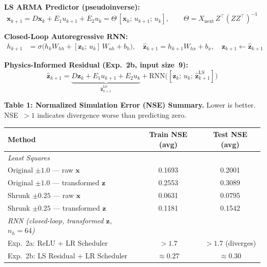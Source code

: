 \documentclass[12pt]{article}
\begin{document}
\noindent\textbf{LS ARMA Predictor (pseudoinverse):}
\begin{equation}
  \mathbf{x}_{k+1} = D\mathbf{x}_k + E_1 u_{k+1} + E_2 u_k = \Theta\,[\mathbf{x}_k;\,u_{k+1};\,u_k], \qquad
  \Theta = X_{\text{next}}\,Z^\top(ZZ^\top)^{-1}
\end{equation}

\noindent\textbf{Closed-Loop Autoregressive RNN:}
\begin{align}
  h_{k+1} &= \sigma\bigl(h_k W_{hh} + [\mathbf{z}_k;\,u_k]\,W_{uh} + b_h\bigr), \quad
  \hat{\mathbf{z}}_{k+1} = h_{k+1}W_{hx} + b_x, \quad \mathbf{z}_{k+1}\leftarrow\hat{\mathbf{z}}_{k+1}
\end{align}

\noindent\textbf{Physics-Informed Residual (Exp.~2b, input size~9):}
\begin{equation}
  \hat{\mathbf{z}}_{k+1} =
    \underbrace{D\mathbf{z}_k+E_1 u_{k+1}+E_2 u_k}_{\hat{\mathbf{z}}_{k+1}^{\text{LS}}}
    + \text{RNN}\bigl([\mathbf{z}_k;\,u_k;\,\hat{\mathbf{z}}_{k+1}^{\text{LS}}]\bigr)
\end{equation}

\vspace{8pt}
\noindent\textbf{Table 1: Normalized Simulation Error (NSE) Summary.}
Lower is better. NSE~$>1$ indicates divergence worse than predicting zero.

\vspace{4pt}
\begin{center}
\small
\begin{tabular}{lcc}
\toprule
\textbf{Method} & \textbf{Train NSE (avg)} & \textbf{Test NSE (avg)}  \\
\midrule
\textit{Least Squares} & & \\
\quad Original $\pm1.0$ --- raw $\mathbf{x}$       & 0.1693 & 0.2001 \\
\quad Original $\pm1.0$ --- transformed $\mathbf{z}$ & 0.2553 & 0.3089 \\
\quad Shrunk $\pm0.25$ --- raw $\mathbf{x}$         & 0.0631 & 0.0795 \\
\quad Shrunk $\pm0.25$ --- transformed $\mathbf{z}$  & 0.1181 & 0.1542 \\
\midrule
\textit{RNN (closed-loop, transformed $\mathbf{z}$, $n_h{=}64$)} & & \\
\quad Exp.~2a: ReLU + LR Scheduler       & $>1.7$ & $>1.7$ \;(diverges) \\
\quad Exp.~2b: LS Residual + LR Scheduler & $\approx0.27$ & $\approx0.30$ \\
\bottomrule
\end{tabular}
\end{center}
\end{document}
